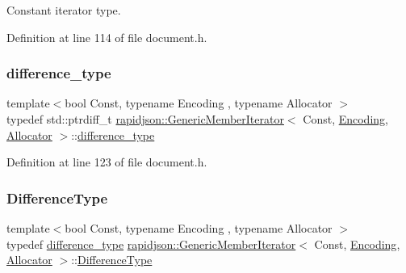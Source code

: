 Constant iterator type. 



Definition at line 114 of file document.\+h.

\mbox{\label{classrapidjson_1_1_generic_member_iterator_a2a981caecbc8b48968bccd6c3fa7513d}} 
\subsubsection{\texorpdfstring{difference\_type}{difference\_type}}
{\footnotesize\ttfamily template$<$bool Const, typename Encoding , typename Allocator $>$ \\
typedef std\+::ptrdiff\+\_\+t \mbox{\hyperlink{classrapidjson_1_1_generic_member_iterator}{rapidjson\+::\+Generic\+Member\+Iterator}}$<$ Const, \mbox{\hyperlink{classrapidjson_1_1_encoding}{Encoding}}, \mbox{\hyperlink{classrapidjson_1_1_allocator}{Allocator}} $>$\+::\mbox{\hyperlink{classrapidjson_1_1_generic_member_iterator_a2a981caecbc8b48968bccd6c3fa7513d}{difference\+\_\+type}}}



Definition at line 123 of file document.\+h.

\mbox{\label{classrapidjson_1_1_generic_member_iterator_aff2739a9265639a7a4be8c3e6216b31a}} 
\subsubsection{\texorpdfstring{DifferenceType}{DifferenceType}}
{\footnotesize\ttfamily template$<$bool Const, typename Encoding , typename Allocator $>$ \\
typedef \mbox{\hyperlink{classrapidjson_1_1_generic_member_iterator_a2a981caecbc8b48968bccd6c3fa7513d}{difference\+\_\+type}} \mbox{\hyperlink{classrapidjson_1_1_generic_member_iterator}{rapidjson\+::\+Generic\+Member\+Iterator}}$<$ Const, \mbox{\hyperlink{classrapidjson_1_1_encoding}{Encoding}}, \mbox{\hyperlink{classrapidjson_1_1_allocator}{Allocator}} $>$\+::\mbox{\hyperlink{classrapidjson_1_1_generic_member_iterator_aff2739a9265639a7a4be8c3e6216b31a}{Difference\+Type}}}



